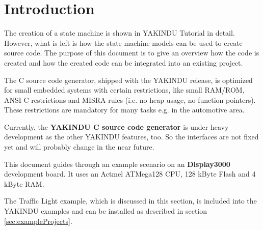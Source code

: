 %
\section{Introduction}

The creation of a state machine is shown in YAKINDU Tutorial in detail. However,
what is left is how the state machine models can be used to create source code.
The purpose of this document is to give an overview how the code is created and
how the created code can be integrated into an existing project.

The C source code generator, shipped with the YAKINDU release, is optimized for
small embedded systems with certain restrictions, like small RAM/ROM, ANSI-C
restrictions and MISRA rules (i.e. no heap usage, no function pointers). These
restrictions are mandatory for many tasks e.g. in the automotive area.

Currently, the \textbf{YAKINDU C source code generator} is under heavy
development as the other YAKINDU features, too. So the interfaces are not fixed
yet and will probably change in the near future.

This document guides through an example scenario on an \textbf{Display3000}
development board. It uses an Actmel ATMega128 CPU, 128 kByte Flash and 4 kByte
RAM.

The Traffic Light example, which is discussed in this section, is included into
the YAKINDU examples and can be installed as described in section
\ref{sec:exampleProjects}.


\clearpage